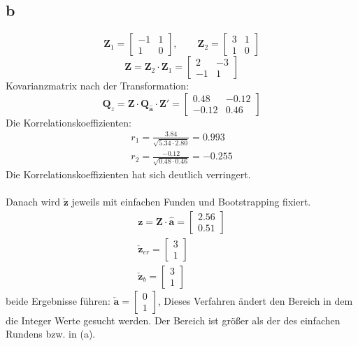 \subsection{b}
\begin{equation*}
	\bm{Z}_1 = \begin{bmatrix}
		-1 & 1 \\
		1 & 0
	\end{bmatrix} ,\qquad \bm{Z}_2 = \begin{bmatrix}
	3 & 1 \\
	1 & 0
\end{bmatrix}
\end{equation*}
\begin{equation*}
	\bm{Z} = \bm{Z}_2 \cdot \bm{Z}_1 = \begin{bmatrix}
		2 & -3 \\
		-1 & 1
	\end{bmatrix}
\end{equation*}
Kovarianzmatrix nach der Transformation:
\begin{equation*}
	\bm{Q}_z = \bm{Z} \cdot \bm{Q_{\hat{a}}} \cdot \bm{Z}' = \begin{bmatrix}
		0.48 & -0.12\\
		-0.12 & 0.46
	\end{bmatrix}
\end{equation*}
Die Korrelationskoeffizienten:
\begin{gather*}
	r_1 = \frac{3.84}{\sqrt{5.34 \cdot 2.80}} = 0.993 \\
	r_2 = \frac{-0.12}{\sqrt{0.48 \cdot 0.46}} = -0.255
\end{gather*}
Die Korrelationskoeffizienten hat sich deutlich verringert.\\\\
Danach wird $\bm{\check{z}}$ jeweils mit einfachen Funden und Bootstrapping fixiert.
\begin{gather*}
	\bm{z} = \bm{Z} \cdot \bm{\hat{a}} = \begin{bmatrix}
		2.56 \\
		0.51
	\end{bmatrix}\\
	\bm{\check{z}}_{er} = \begin{bmatrix}
		3 \\ 1
	\end{bmatrix} \\
	\bm{\check{z}}_{b} = \begin{bmatrix}
		3 \\ 1
	\end{bmatrix}
\end{gather*}
beide Ergebnisse führen: $\bm{\check{a}} = \begin{bmatrix}
	0 \\ 1
\end{bmatrix}$, Dieses Verfahren ändert den Bereich in dem die Integer Werte gesucht werden. Der Bereich ist größer als der des einfachen Rundens bzw. in (a).
